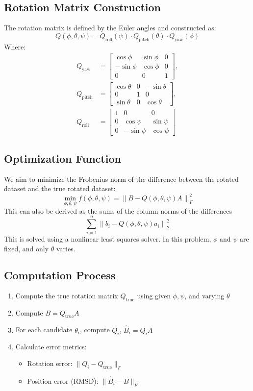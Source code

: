 \documentclass[12pt]{article}
\begin{document}
\subsection*{Rotation Matrix Construction}
The rotation matrix is defined by the Euler angles and constructed as:
\[
Q(\phi, \theta, \psi) = Q_{\text{roll}}(\psi) \cdot Q_{\text{pitch}}(\theta) \cdot Q_{\text{yaw}}(\phi)
\]
Where:
\begin{align*}
Q_{\text{yaw}} &= \begin{bmatrix} \cos\phi & \sin\phi & 0 \\ -\sin\phi & \cos\phi & 0 \\ 0 & 0 & 1 \end{bmatrix}, \\
Q_{\text{pitch}} &= \begin{bmatrix} \cos\theta & 0 & -\sin\theta \\ 0 & 1 & 0 \\ \sin\theta & 0 & \cos\theta \end{bmatrix}, \\
Q_{\text{roll}} &= \begin{bmatrix} 1 & 0 & 0 \\ 0 & \cos\psi & \sin\psi \\ 0 & -\sin\psi & \cos\psi \end{bmatrix}
\end{align*}

\subsection*{Optimization Function}
We aim to minimize the Frobenius norm of the difference between the rotated dataset and the true rotated dataset:
\[
\min_{\phi, \theta, \psi} f(\phi, \theta, \psi) = \left\| B - Q(\phi, \theta, \psi) A \right\|_F^2
\]
This can also be derived as the sums of the column norms of the differences
\[\sum_{i=1}^{n}\left\| b_i - Q(\phi, \theta, \psi)a_i \right\|^2_2\]
This is solved using a nonlinear least squares solver. In this problem, \( \phi \) and \( \psi \) are fixed, and only \( \theta \) varies.

\subsection*{Computation Process}
\begin{enumerate}
  \item Compute the true rotation matrix \( Q_{\text{true}} \) using given \( \phi, \psi \), and varying \( \theta \)
  \item Compute \( B = Q_{\text{true}} A \)
  \item For each candidate \( \theta_i \), compute \( Q_i \), \( \hat{B}_i = Q_i A \)
  \item Calculate error metrics:
  \begin{itemize}
    \item Rotation error: \( \| Q_i - Q_{\text{true}} \|_F \)
    \item Position error (RMSD): \( \| \hat{B}_i - B \|_F \)
  \end{itemize}
\end{enumerate}
\end{document}
